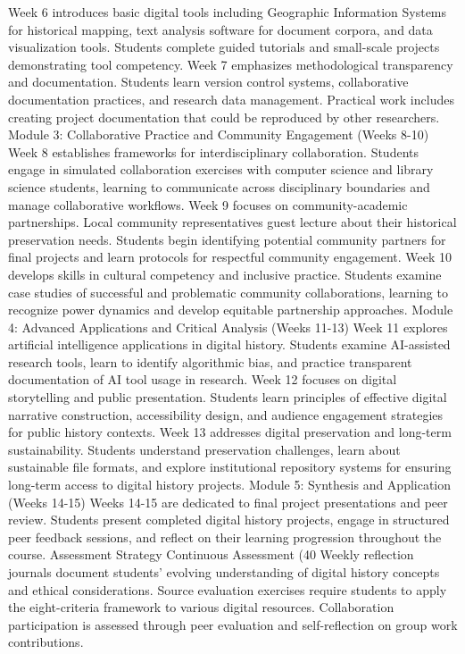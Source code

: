 Week 6 introduces basic digital tools including Geographic Information Systems for historical mapping, text analysis software for document corpora, and data visualization tools. Students complete guided tutorials and small-scale projects demonstrating tool competency.
Week 7 emphasizes methodological transparency and documentation. Students learn version control systems, collaborative documentation practices, and research data management. Practical work includes creating project documentation that could be reproduced by other researchers.
Module 3: Collaborative Practice and Community Engagement (Weeks 8-10)
Week 8 establishes frameworks for interdisciplinary collaboration. Students engage in simulated collaboration exercises with computer science and library science students, learning to communicate across disciplinary boundaries and manage collaborative workflows.
Week 9 focuses on community-academic partnerships. Local community representatives guest lecture about their historical preservation needs. Students begin identifying potential community partners for final projects and learn protocols for respectful community engagement.
Week 10 develops skills in cultural competency and inclusive practice. Students examine case studies of successful and problematic community collaborations, learning to recognize power dynamics and develop equitable partnership approaches.
Module 4: Advanced Applications and Critical Analysis (Weeks 11-13)
Week 11 explores artificial intelligence applications in digital history. Students examine AI-assisted research tools, learn to identify algorithmic bias, and practice transparent documentation of AI tool usage in research.
Week 12 focuses on digital storytelling and public presentation. Students learn principles of effective digital narrative construction, accessibility design, and audience engagement strategies for public history contexts.
Week 13 addresses digital preservation and long-term sustainability. Students understand preservation challenges, learn about sustainable file formats, and explore institutional repository systems for ensuring long-term access to digital history projects.
Module 5: Synthesis and Application (Weeks 14-15)
Weeks 14-15 are dedicated to final project presentations and peer review. Students present completed digital history projects, engage in structured peer feedback sessions, and reflect on their learning progression throughout the course.
Assessment Strategy
Continuous Assessment (40%
Weekly reflection journals document students' evolving understanding of digital history concepts and ethical considerations. Source evaluation exercises require students to apply the eight-criteria framework to various digital resources. Collaboration participation is assessed through peer evaluation and self-reflection on group work contributions.
